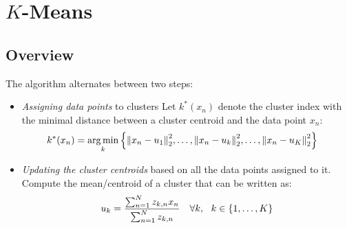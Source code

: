 \section{$K$-Means}
\subsection{Overview}

The algorithm alternates between two steps:
\begin{itemize}
    \item \emph{Assigning data points} to clusters
    Let $k^*(x_n)$ denote the cluster index with the minimal distance between a cluster centroid and the data point $x_n$:
    \begin{align*}
    k^*(x_n) &=\argmin_k \left\{ \norm{x_n-u_1}_2^2,\ldots, \norm{x_n-u_k}_2^2,\ldots,\norm{x_n-u_K}_2^2 \right\}
    \end{align*}

    \item \emph{Updating the cluster centroids} based on all the data points assigned to it. Compute the mean/centroid of a cluster that can be written as:
    \begin{align*}
        u_k = {\sum_{n=1}^N z_{k,n} x_n \over \sum_{n=1}^N z_{k,n} }\quad \forall k,\ \ k\in \{1,\ldots,K\}
    \end{align*}
\end{itemize}

